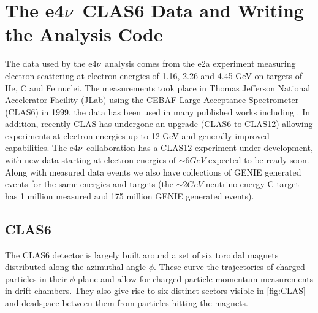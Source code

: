 \documentclass[a4paper,12pt]{article}
\newcommand{\efn}{e4$\nu$}
\begin{document}
\section{The \efn\ CLAS6 Data and Writing the Analysis Code}
The data used by the \efn\ analysis comes from the e2a experiment measuring electron scattering at electron energies of 1.16, 2.26 and 4.45 \si{GeV} on targets of He, C and Fe nuclei.
The measurements took place in Thomas Jefferson National Accelerator Facility (JLab) using the CEBAF Large Acceptance Spectrometer (CLAS6) \cite{meckingCEBAFLargeAcceptance2003} in 1999, the data has been used in many published works including \cite{khachatryanElectronbeamEnergyReconstruction2021,mclauchlanDeltaElectroproduction12C}.
In addition, recently CLAS has undergone an upgrade (CLAS6 to CLAS12) \cite{burkertCLAS12SpectrometerJefferson2020} allowing experiments at electron energies up to 12 \si{GeV} and generally improved capabilities.
The \efn\ collaboration has a CLAS12 experiment under development, with new data starting at electron energies of $\sim6 \si{GeV}$ expected to be ready soon.
Along with measured data events we also have collections of GENIE generated events for the same energies and targets (the $\sim 2\si{GeV}$ neutrino energy C target has 1 million measured and 175 million GENIE generated events).

\subsection{CLAS6}\label{sec:CLAS6}
The CLAS6 detector is largely built around a set of six toroidal magnets distributed along the azimuthal angle $\phi$.
These curve the trajectories of charged particles in their $\phi$ plane and allow for charged particle momentum measurements in drift chambers.
They also give rise to six distinct sectors visible in \cref{fig:CLAS} and deadspace between them from particles hitting the magnets.
\end{document}
